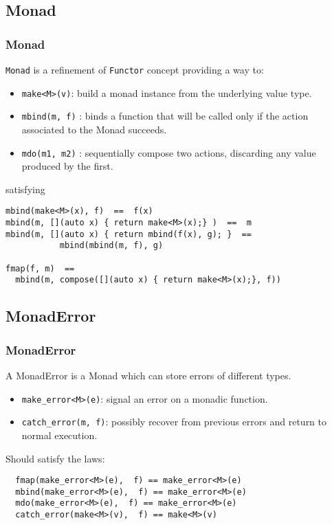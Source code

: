\documentclass[xcolor=dvipsnames]{beamer}
\newcommand{\cpp}[1]{\lstinline{#1}}
\begin{document}
\subsection{Monad}
\begin{frame}[fragile]
\frametitle{Monad}

\cpp{Monad} is a refinement of \cpp{Functor} concept  providing a way to:

\begin{itemize}
  \item \cpp{make<M>(v)}: build a monad instance from the underlying value type.
  \item \cpp{mbind(m, f)} : binds a function that will be called only if the action associated to the Monad succeeds.
  \item \cpp{mdo(m1, m2)} : sequentially compose two actions, discarding any value produced by the first.
\end{itemize}

satisfying

\begin{lstlisting}
mbind(make<M>(x), f)  ==  f(x)
mbind(m, [](auto x) { return make<M>(x);} )  ==  m
mbind(m, [](auto x) { return mbind(f(x), g); }  ==  
           mbind(mbind(m, f), g)

fmap(f, m)  ==  
  mbind(m, compose([](auto x) { return make<M>(x);}, f))
\end{lstlisting}
\end{frame}

\subsection{MonadError}
\begin{frame}[fragile]
\frametitle{MonadError}

A MonadError is a Monad which can store errors of different types.

\begin{itemize}
  \item \cpp{make_error<M>(e)}: signal an error on a monadic function.
  \item \cpp{catch_error(m, f)}: possibly recover from previous errors and return to normal execution.
\end{itemize}

Should satisfy the laws:

\begin{lstlisting}
  fmap(make_error<M>(e),  f) == make_error<M>(e)
  mbind(make_error<M>(e),  f) == make_error<M>(e)
  mdo(make_error<M>(e),  f) == make_error<M>(e)
  catch_error(make<M>(v),  f) == make<M>(v)
\end{lstlisting}
\end{frame}
\end{document}
